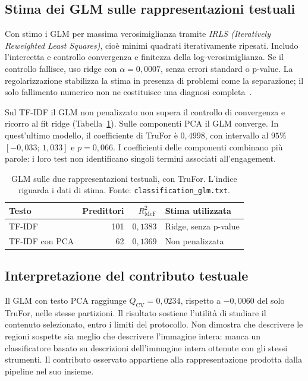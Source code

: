 \subsection{Stima dei GLM sulle rappresentazioni testuali}
\label{subsec:associazione-testo-glm}

Con  stimo i GLM per massima verosimiglianza tramite \emph{IRLS (Iteratively Reweighted Least Squares)}, cioè minimi quadrati iterativamente ripesati. Includo l'intercetta e controllo convergenza e finitezza della log-verosimiglianza. Se il controllo fallisce, uso ridge con $\alpha=0{,}0007$, senza errori standard o p-value. La regolarizzazione stabilizza la stima in presenza di problemi come la separazione; il solo fallimento numerico non ne costituisce una diagnosi completa~\cite{10.1093/biomet/71.1.1}.

Sul TF-IDF il GLM non penalizzato non supera il controllo di convergenza e ricorro al fit ridge (Tabella~\ref{tab:associazione-glm-testo}). Sulle componenti PCA il GLM converge. In quest'ultimo modello, il coefficiente di TruFor è $0{,}4998$, con intervallo al $95\%$ $[-0{,}033;\,1{,}033]$ e $p=0{,}066$. I coefficienti delle componenti combinano più parole: i loro test non identificano singoli termini associati all'engagement.

\begin{table}[htbp]
    \centering\small
    \caption{GLM sulle due rappresentazioni testuali, con TruFor. L'indice riguarda i dati di stima. Fonte: \texttt{classification\_glm.txt}.}
    \label{tab:associazione-glm-testo}
    \begin{tabular}{@{}lrrl@{}}
        \toprule
        Testo & Predittori & $R^2_{\mathrm{McF}}$ & Stima utilizzata \\
        \midrule
        TF-IDF & 101 & $0{,}1383$ & Ridge, senza p-value \\
        TF-IDF con PCA & 62 & $0{,}1369$ & Non penalizzata \\
        \bottomrule
    \end{tabular}
\end{table}

\newpage
\subsection{Interpretazione del contributo testuale}
\label{subsec:associazione-testo-interpretazione}

Il GLM con testo PCA raggiunge $Q_{\mathrm{CV}}=0{,}0234$, rispetto a $-0{,}0060$ del solo TruFor, nelle stesse partizioni. Il risultato sostiene l'utilità di studiare il contenuto selezionato, entro i limiti del protocollo. Non dimostra che descrivere le regioni sospette sia meglio che descrivere l'immagine intera: manca un classificatore basato su descrizioni dell'immagine intera ottenute con gli stessi strumenti. Il contributo osservato appartiene alla rappresentazione prodotta dalla pipeline nel suo insieme.

